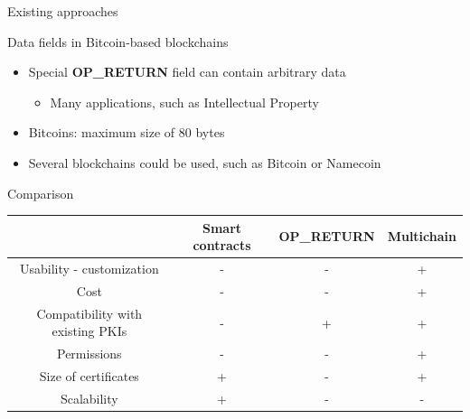 %
%	
%

\begin{frame}{Existing approaches}
	\begin{exampleblock}{Data fields in Bitcoin-based blockchains}
		\begin{itemize}
			\item Special \textbf{OP\_RETURN} field can contain arbitrary data
			\begin{itemize}
				\item Many applications, such as Intellectual Property
			\end{itemize}
			\item Bitcoins: maximum size of 80 bytes
			\item Several blockchains could be used, such as Bitcoin or Namecoin
		\end{itemize}
	\end{exampleblock}
\end{frame}




\begin{frame}{Comparison}

\begin{tabular}{|c|c|c|c|}
\hline 
  & Smart contracts & OP\_RETURN & Multichain \\ 
\hline 
Usability - customization & - & - & + \\ 
\hline 
Cost & - & - & + \\ 
\hline 
Compatibility with existing PKIs & - & + & + \\ 
\hline 
Permissions & - & - & + \\ 
\hline 
Size of certificates & + & - & + \\ 
\hline 
Scalability & + & - & - \\ 
\hline 
\end{tabular} 

\end{frame}




